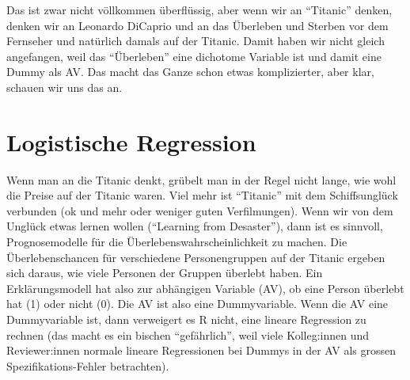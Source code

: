 \documentclass[
  10pt,
  letterpaper,
  a4paper, twoside]{scrreprt}
\begin{document}
Das ist zwar nicht völlkommen überflüssig, aber wenn wir an
\enquote{Titanic} denken, denken wir an Leonardo DiCaprio und an das
Überleben und Sterben vor dem Fernseher und natürlich damals auf der
Titanic. Damit haben wir nicht gleich angefangen, weil das
\enquote{Überleben} eine dichotome Variable ist und damit eine Dummy als
AV. Das macht das Ganze schon etwas komplizierter, aber klar, schauen
wir uns das an.

\section{Logistische Regression}\label{logistische-regression}

Wenn man an die Titanic denkt, grübelt man in der Regel nicht lange, wie
wohl die Preise auf der Titanic waren. Viel mehr ist \enquote{Titanic}
mit dem Schiffsunglück verbunden (ok und mehr oder weniger guten
Verfilmungen). Wenn wir von dem Unglück etwas lernen wollen
(\enquote{Learning from Desaster}), dann ist es sinnvoll,
Prognosemodelle für die Überlebenswahrscheinlichkeit zu machen. Die
Überlebenschancen für verschiedene Personengruppen auf der Titanic
ergeben sich daraus, wie viele Personen der Gruppen überlebt haben. Ein
Erklärungsmodell hat also zur abhängigen Variable (AV), ob eine Person
überlebt hat (1) oder nicht (0). Die AV ist also eine Dummyvariable.
Wenn die AV eine Dummyvariable ist, dann verweigert es R nicht, eine
lineare Regression zu rechnen (das macht es ein bischen
\enquote{gefährlich}, weil viele Kolleg:innen und Reviewer:innen normale
lineare Regressionen bei Dummys in der AV als grossen
Spezifikations-Fehler betrachten).
\end{document}
